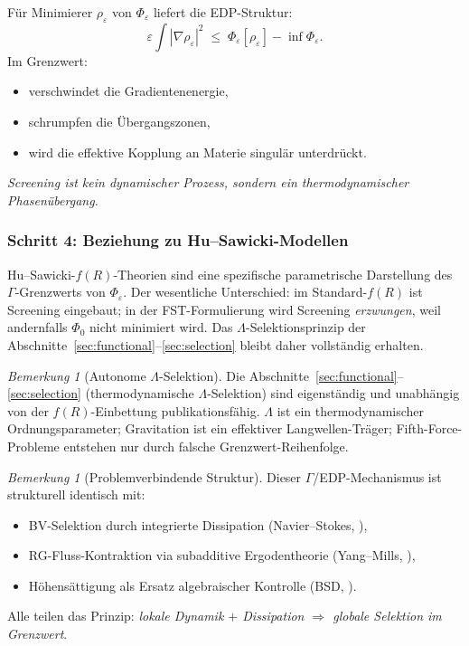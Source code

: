 \documentclass[12pt,a4paper]{article}
\theoremstyle{definition}
\theoremstyle{plain}
\theoremstyle{remark}
\newtheorem{remark}[definition]{Bemerkung}
\begin{document}
F\"ur Minimierer $\rho_\varepsilon$ von $\Phi_\varepsilon$ liefert die EDP-Struktur:
\begin{equation}\label{eq:edp-screening}
  \varepsilon \int |\nabla\rho_\varepsilon|^2 \;\leq\; \Phi_\varepsilon[\rho_\varepsilon] - \inf\Phi_\varepsilon.
\end{equation}
Im Grenzwert:
\begin{itemize}
\item verschwindet die Gradientenenergie,
\item schrumpfen die \"Ubergangszonen,
\item wird die effektive Kopplung an Materie singul\"ar unterdr\"uckt.
\end{itemize}
\emph{Screening ist kein dynamischer Prozess, sondern ein thermodynamischer Phasen\"ubergang.}

\subsubsection*{Schritt 4: Beziehung zu Hu--Sawicki-Modellen}

Hu--Sawicki-$f(R)$-Theorien sind eine spezifische parametrische Darstellung des $\Gamma$-Grenzwerts von $\Phi_\varepsilon$. Der wesentliche Unterschied: im Standard-$f(R)$ ist Screening eingebaut; in der FST-Formulierung wird Screening \emph{erzwungen}, weil andernfalls $\Phi_0$ nicht minimiert wird. Das $\Lambda$-Selektionsprinzip der Abschnitte~\ref{sec:functional}--\ref{sec:selection} bleibt daher vollst\"andig erhalten.

\begin{remark}[Autonome $\Lambda$-Selektion]\label{rem:autonomous-lambda}
Die Abschnitte~\ref{sec:functional}--\ref{sec:selection} (thermodynamische $\Lambda$-Selektion) sind eigenst\"andig und unabh\"angig von der $f(R)$-Einbettung publikationsf\"ahig. $\Lambda$ ist ein thermodynamischer Ordnungsparameter; Gravitation ist ein effektiver Langwellen-Tr\"ager; Fifth-Force-Probleme entstehen nur durch falsche Grenzwert-Reihenfolge.
\end{remark}

\begin{remark}[Problemverbindende Struktur]\label{rem:cross-edp-de}
Dieser $\Gamma$/EDP-Mechanismus ist strukturell identisch mit:
\begin{itemize}
\item BV-Selektion durch integrierte Dissipation (Navier--Stokes, \cite{FST-NS2026}),
\item RG-Fluss-Kontraktion via subadditive Ergodentheorie (Yang--Mills, \cite{Geiger2026-YM}),
\item H\"ohens\"attigung als Ersatz algebraischer Kontrolle (BSD, \cite{Geiger2026-BSD}).
\end{itemize}
Alle teilen das Prinzip: \emph{lokale Dynamik $+$ Dissipation $\Rightarrow$ globale Selektion im Grenzwert}.
\end{remark}
\end{document}
